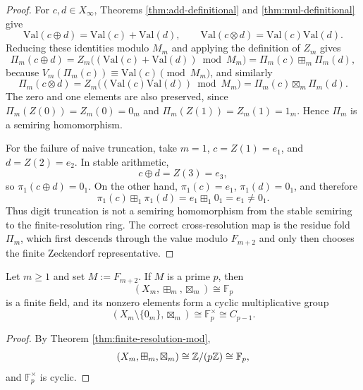 \begin{proof}
For \(c,d\in X_\infty\), Theorems \ref{thm:add-definitional} and \ref{thm:mul-definitional} give
\[
\mathrm{Val}(c\oplus d)=\mathrm{Val}(c)+\mathrm{Val}(d),
\qquad
\mathrm{Val}(c\otimes d)=\mathrm{Val}(c)\mathrm{Val}(d).
\]
Reducing these identities modulo \(M_m\) and applying the definition of \(Z_m\) gives
\[
\Pi_m(c\oplus d)
=Z_m\bigl((\mathrm{Val}(c)+\mathrm{Val}(d))\bmod M_m\bigr)
=\Pi_m(c)\boxplus_m\Pi_m(d),
\]
because \(V_m(\Pi_m(c))\equiv \mathrm{Val}(c)\pmod {M_m}\), and similarly
\[
\Pi_m(c\otimes d)
=Z_m\bigl((\mathrm{Val}(c)\mathrm{Val}(d))\bmod M_m\bigr)
=\Pi_m(c)\boxtimes_m\Pi_m(d).
\]
The zero and one elements are also preserved, since \(\Pi_m(Z(0))=Z_m(0)=0_m\) and \(\Pi_m(Z(1))=Z_m(1)=1_m\). Hence \(\Pi_m\) is a semiring homomorphism.

For the failure of naive truncation, take \(m=1\), \(c=Z(1)=e_1\), and \(d=Z(2)=e_2\). In stable arithmetic,
\[
c\oplus d=Z(3)=e_3,
\]
so \(\pi_1(c\oplus d)=0_1\). On the other hand, \(\pi_1(c)=e_1\), \(\pi_1(d)=0_1\), and therefore
\[
\pi_1(c)\boxplus_1\pi_1(d)=e_1\boxplus_1 0_1=e_1\ne 0_1.
\]
Thus digit truncation is not a semiring homomorphism from the stable semiring to the finite-resolution ring. The correct cross-resolution map is the residue fold \(\Pi_m\), which first descends through the value modulo \(F_{m+2}\) and only then chooses the finite Zeckendorf representative.
\end{proof}

\begin{corollary}\label{cor:field-phase-fib-prime}
Let \(m\ge 1\) and set \(M:=F_{m+2}\). If \(M\) is a prime \(p\), then
\[
(X_m,\boxplus_m,\boxtimes_m)\cong \mathbb{F}_p
\]
is a finite field, and its nonzero elements form a cyclic multiplicative group
\[
(X_m\setminus\{0_m\},\boxtimes_m)\cong \mathbb{F}_p^\times\cong C_{p-1}.
\]
\end{corollary}

\begin{proof}
By Theorem \ref{thm:finite-resolution-mod},
\[
(X_m,\boxplus_m,\boxtimes_m)\cong \mathbb{Z}/(p\mathbb{Z})\cong\mathbb{F}_p,
\]
and \(\mathbb{F}_p^\times\) is cyclic.
\end{proof}

